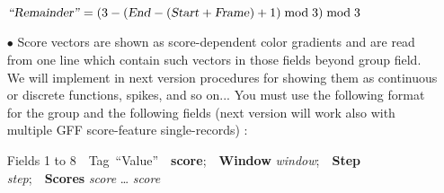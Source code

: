 \begin{itemize}
\centerline{\label{fml:remainder}$\mbox{\textsl{``Remainder''}} = ( 3 - ( \mbox{\textsl{End}} - ( \mbox{\textsl{Start}} + \mbox{\textsl{Frame}} ) + 1 ) \bmod 3 ) \bmod 3$}
\item[$\bullet$] Score vectors are shown as score-dependent color gradients and are read from one line which contain such vectors in those fields beyond group field. We will implement in next version procedures for showing them as continuous or discrete functions, spikes, and so on... You must use the following format for the group and the following fields (next version will work also with multiple GFF score-feature single-records) :\label{vectordef}\\

\centerline{\small{}Fields 1 to 8\ \ Tag\ ``Value''\ \ \textbf{score};\ \ \textbf{Window} \textit{window};\ \ \textbf{Step} \textit{step};\ \ \textbf{Scores} \textit{score} \ldots{} \textit{score}}

\end{itemize}



